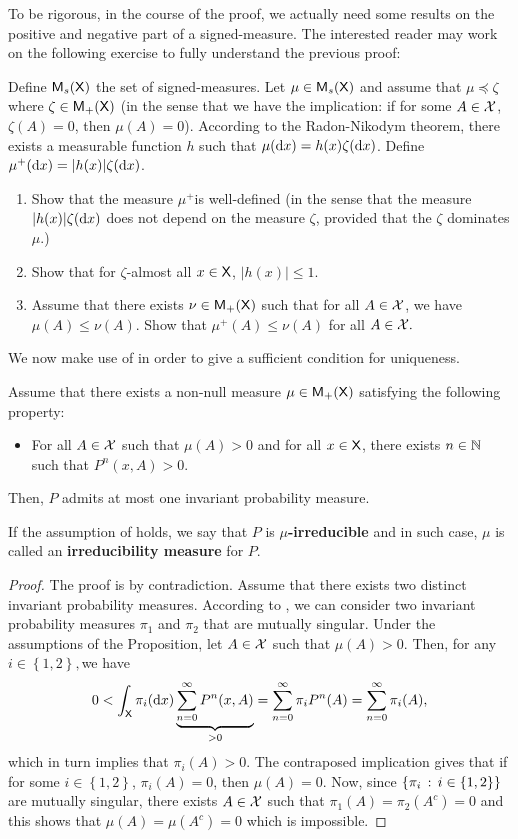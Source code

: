 \documentclass[english,graybox,envcountchap,envcountsame,sectrefs,shortlabels]{svmono}
\theoremstyle{style}
\newenvironment{svmultproof}{\small \begin{proof}}{\end{proof}}
\newcommand{\bs}{\begin{shaded}}
\newcommand{\es}{\end{shaded}}
\newcommand{\blb}{\begin{leftbar}}
\newcommand{\elb}{\end{leftbar}}
\begin{document}
To be rigorous, in the course of the proof, we actually need some
results on the positive and negative part of a signed-measure. The
interested reader may work on the following exercise to fully understand
the previous proof: \blb
\begin{exercise}
Define $\mathsf{M}_{s}(\mathsf{X})$ the set of signed-measures. Let $\mu\in\mathsf{M}_{s}(\mathsf{X})$
and assume that $\mu\preceq\zeta$ where $\zeta\in\mathsf{M}_{+}(\mathsf{X})$
(in the sense that we have the implication: if for some $A\in\mathcal{X}$,
$\zeta(A)=0$, then $\mu(A)=0$). According to the Radon-Nikodym theorem,
there exists a measurable function $h$ such that $\mu(\mathrm{d} x)=h(x)\zeta(\mathrm{d} x)$.
Define $\mu^{+}(\mathrm{d} x)=|h(x)|\zeta(\mathrm{d} x)$.
\begin{enumerate}
\item Show that the measure $\mu^{+}$is well-defined (in the sense that
the measure $|h(x)|\zeta(\mathrm{d} x)$ does not depend on the measure
$\zeta$, provided that the $\zeta$ dominates $\mu$.)
\item Show that for $\zeta$-almost all $x\in\mathsf{X}$, $|h(x)|\leq1$.
\item Assume that there exists $\nu\in\mathsf{M}_{+}(\mathsf{X})$ such that for all
$A\in\mathcal{X}$, we have $\mu(A)\leq\nu(A)$. Show that $\mu^{+}(A)\leq\nu(A)$
for all $A\in\mathcal{X}.$
\end{enumerate}
\end{exercise}
\elb We now make use of  in order to
give a sufficient condition for uniqueness.

\bs
\begin{proposition}
\label{prop:unique}Assume that there exists a non-null measure \textup{$\mu\in\mathsf{M}_{+}(\mathsf{X})$}
satisfying the following property:
\begin{itemize}
\item For all $A\in\mathcal{X}$ such that $\mu(A)>0$ and for all $x\in\mathsf{X}$,
there exists $n\in\mathbb{N}$ such that $P^{n}(x,A)>0$.
\end{itemize}
Then, $P$ admits at most one invariant probability measure.
\end{proposition}
\es If the assumption of  holds, we say that $P$
is \textbf{$\mu$-irreducible} and in such case, $\mu$ is called
an \textbf{irreducibility measure} for $P$.
\begin{svmultproof}
The proof is by contradiction. Assume that there exists two distinct
invariant probability measures. According to ,
we can consider two invariant probability measures $\pi_{1}$ and
$\pi_{2}$ that are mutually singular. Under the assumptions of the
Proposition, let $A\in\mathcal{X}$ such that $\mu(A)>0$. Then, for any
$i\in\left\{ 1,2\right\} ,$we have
\[
0<\int_{\mathsf{X}}\pi_{i}(\mathrm{d} x)\underbrace{\sum_{n=0}^{\infty}P^{n}(x,A)}_{>0}=\sum_{n=0}^{\infty}\pi_{i}P^{n}(A)=\sum_{n=0}^{\infty}\pi_{i}(A),
\]
which in turn implies that $\pi_{i}(A)>0$. The contraposed implication
gives that if for some $i\in\left\{ 1,2\right\} $, $\pi_{i}(A)=0$,
then $\mu(A)=0$. Now, since $\left\{ \pi_{i}\,:\,i\in\left\{ 1,2\right\} \right\}$
are mutually singular, there exists $A\in\mathcal{X}$ such that $\pi_{1}(A)=\pi_{2}(A^{c})=0$
and this shows that $\mu(A)=\mu(A^{c})=0$ which is impossible.
\end{svmultproof}
\end{document}
